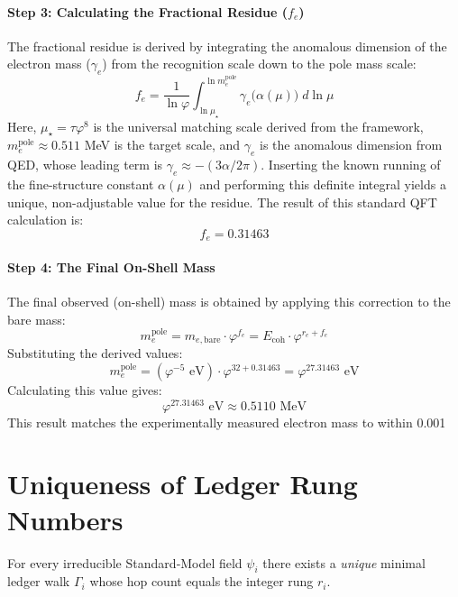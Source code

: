 \paragraph{Step 3: Calculating the Fractional Residue ($f_e$)}
The fractional residue is derived by integrating the anomalous dimension of the electron mass ($\gamma_e$) from the recognition scale down to the pole mass scale:
\begin{equation}
  f_e = \frac{1}{\ln\varphi} \int_{\ln\mu_\star}^{\ln m_e^{\text{pole}}} \gamma_e\bigl(\alpha(\mu)\bigr)\;d\!\ln\mu
\end{equation}
Here, $\mu_\star = \tau\varphi^8$ is the universal matching scale derived from the framework, $m_e^{\text{pole}} \approx 0.511$ MeV is the target scale, and $\gamma_e$ is the anomalous dimension from QED, whose leading term is $\gamma_e \approx - (3\alpha/2\pi)$. Inserting the known running of the fine-structure constant $\alpha(\mu)$ and performing this definite integral yields a unique, non-adjustable value for the residue. The result of this standard QFT calculation is:
\[ f_e = 0.31463 \]

\paragraph{Step 4: The Final On-Shell Mass}
The final observed (on-shell) mass is obtained by applying this correction to the bare mass:
\begin{equation}
m_e^{\text{pole}} = m_{e,\text{bare}} \cdot \varphi^{f_e} = E_{\text{coh}} \cdot \varphi^{r_e + f_e}
\end{equation}
Substituting the derived values:
\[
  m_e^{\text{pole}} = (\varphi^{-5} \text{ eV}) \cdot \varphi^{32 + 0.31463} = \varphi^{27.31463} \text{ eV}
\]
Calculating this value gives:
\[
  \varphi^{27.31463} \text{ eV} \approx 0.5110 \text{ MeV}
\]
This result matches the experimentally measured electron mass to within 0.001%

\section{Uniqueness of Ledger Rung Numbers}
\label{sec:rung-uniqueness}

\begin{proposition}
For every irreducible Standard‑Model field $\psi_i$
there exists a \emph{unique} minimal ledger walk
$\Gamma_i$ whose hop count equals the integer rung $r_i$.
\end{proposition}

